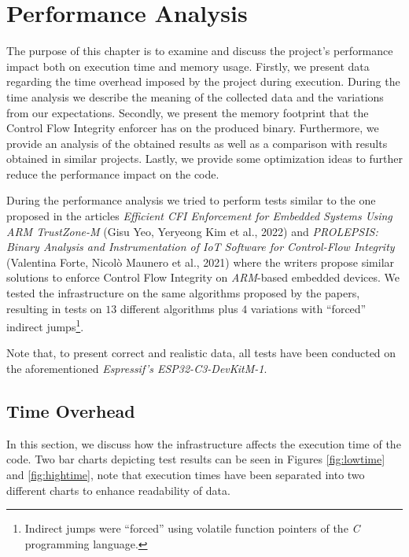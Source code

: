 \chapter{Performance Analysis}
\label{cha:pa}

The purpose of this chapter is to examine and discuss the project's performance
impact both on execution time and memory usage. Firstly, we present data
regarding the time overhead imposed by the project during execution. During the time
analysis we describe the meaning of the collected data and the variations from our
expectations. Secondly, we present the memory footprint that the Control Flow Integrity
enforcer has on the produced binary. Furthermore, we provide an analysis of the obtained
results as well as a comparison with results obtained in similar projects.
Lastly, we provide some optimization ideas to further reduce the performance impact
on the code.

During the performance analysis we tried to perform tests similar to the one proposed
in the articles \textit{Efficient CFI Enforcement for Embedded Systems Using ARM
TrustZone-M} (Gisu Yeo, Yeryeong Kim et al., 2022)\cite{article1} and \textit{PROLEPSIS:
Binary Analysis and Instrumentation of IoT Software for Control-Flow Integrity} (Valentina
Forte, Nicol\`{o} Maunero et al., 2021)\cite{article2} where the writers propose
similar solutions to enforce Control Flow Integrity on \textit{ARM}-based
embedded devices. We tested the infrastructure on the same algorithms proposed by
the papers, resulting in tests on $13$ different algorithms plus $4$ variations
with ``forced'' indirect jumps\footnote{Indirect jumps were ``forced'' using
volatile function pointers of the \textit{C} programming language.}.

Note that, to present correct and realistic data, all tests have been conducted on
the aforementioned \textit{Espressif's ESP32-C3-DevKitM-1}.

\section{Time Overhead}
\label{sec:pa_time}

In this section, we discuss how the infrastructure affects the execution time of
the code. Two bar charts depicting test results can be seen in Figures \ref{fig:lowtime}
and \ref{fig:hightime}, note that execution times have been separated into two
different charts to enhance readability of data.

